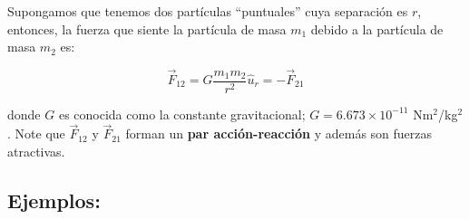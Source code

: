 Supongamos que tenemos dos partículas ``puntuales'' cuya separación es $r$, entonces, la fuerza que siente la partícula de masa $m_1$ debido a la partícula de masa $m_2$ es:

\begin{equation}
\boxed{
\vec{F}_{12}= G \dfrac{m_1m_2}{r^2}\hat{u}_r = -\vec{F}_{21}
} 
\end{equation}

donde $G$ es conocida como la constante gravitacional; $G=6.673 \times 10^{-11}$ Nm$^2$/kg$^2$. Note que $\vec{F}_{12}$ y $\vec{F}_{21}$ forman un \textbf{par acción-reacción} y además son fuerzas atractivas.



\subsection{Ejemplos:}

